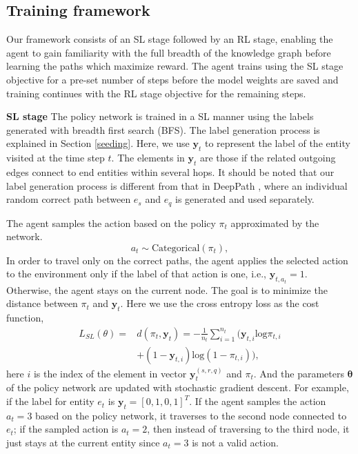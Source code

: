 \documentclass[lettersize,journal]{IEEEtran}
\begin{document}
\subsection{Training framework}
\label{train framework}
Our framework consists of an SL stage followed by an RL stage, enabling the agent to gain familiarity with the full breadth of the knowledge graph before learning the paths which maximize reward. The agent trains using the SL stage objective for a pre-set number of steps before the model weights are saved and training continues with the RL stage objective for the remaining steps.

\textbf{SL stage} The policy network is trained in a SL manner using the labels generated with breadth first search (BFS). The label generation process is explained in Section \ref{seeding}. Here, we use $\mathbf{y}_t$ to represent the label of the entity visited at the time step $t$. The elements in $\mathbf{y}_t$ are those if the related outgoing edges connect to end entities within several hops. It should be noted that our label generation process is different from that in DeepPath \cite{wenhan_emnlp2017}, where an individual random correct path between $e_s$ and $e_q$ is generated and used separately. 

The agent samples the action based on the policy $\pi_t$ approximated by the network.
\begin{equation}
    a_t \sim \mathrm{Categorical}(\pi_t),
\end{equation}
In order to travel only on the correct paths, the agent applies the selected action to the environment only if the label of that action is one, i.e., $\mathbf{y}_{t,a_t}=1$. Otherwise, the agent stays on the current node. The goal is to minimize the distance between $\pi_t$ and $\mathbf{y}_t$. Here we use the cross entropy loss as the cost function,
\begin{align}
L_{SL}(\theta) =&d(\pi_t,\mathbf{y}_{t})=-\frac{1}{n_t}\sum_{i=1}^{n_t}(\mathbf{y}_{t,i}\mathrm{log}\pi_{t,i}\nonumber\\
    &+(1-\mathbf{y}_{t,i})\mathrm{log}(1-\pi_{t,i})),
\end{align}
here $i$ is the index of the element in vector $\mathbf{y}_{t }^{(s,r,q)}$ and $\pi_{t}$. And the parameters $\mathbf{\theta}$ of the policy network are updated with stochastic gradient descent.
For example, if the label for entity $e_t$ is $\mathbf{y}_t=[0,1,0,1]^T$. If the agent samples the action $a_t=3$ based on the policy network, it traverses to the second node connected to $e_t$; if the sampled action is $a_t=2$, then instead of traversing to the third node, it just stays at the current entity since $a_t=3$ is not a valid action.
\end{document}
